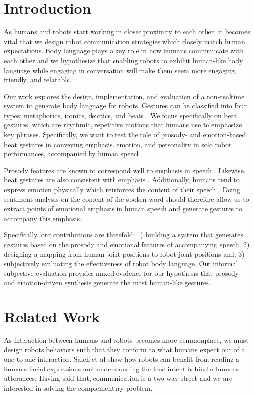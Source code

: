\section{Introduction}
As humans and robots start working in closer proximity to each other, it becomes vital that we design robot communication strategies which closely match human expectations. Body language plays a key role in how humans communicate with each other \cite{mcneill:levine} and we hypothesize that enabling robots to exhibit human-like body language while engaging in conversation will make them seem more engaging, friendly, and relatable.

Our work explores the design, implementation, and evaluation of a non-realtime system to generate body language for robots. Gestures can be classified into four types: metaphorics, iconics, deictics, and beats \cite{mcneill:levine}. We focus specifically on beat gestures, which are rhythmic, repetitive motions that humans use to emphasize key phrases. Specifically, we want to test the role of prosody- and emotion-based beat gestures in conveying emphasis, emotion, and personality in solo robot performances, accompanied by human speech.

Prosody features are known to correspond well to emphasis in speech \cite{terken:levine}. Likewise, beat gestures are also consistent with emphasis \cite{mcneill:levine}. Additionally, humans tend to express emotion physically which reinforces the content of their speech \cite{vosk}. Doing sentiment analysis on the content of the spoken word should therefore allow us to extract points of emotional emphasis in human speech and generate gestures to accompany this emphasis.

Specifically, our contributions are threefold: 1) building a system that generates gestures based on the prosody and emotional features of accompanying speech, 2) designing a mapping from human joint positions to robot joint positions and, 3) subjectively evaluating the effectiveness of robot body language. Our informal subjective evaluation provides mixed evidence for our hypothesis that prosody- and emotion-driven synthesis generate the most human-like gestures.

\section{Related Work}
As interaction between humans and robots becomes more commonplace, we must design robots behaviors such that they conform to what humans expect out of a one-to-one interaction. Saleh et al \cite{saleh:10} show how robots can benefit from reading a human\textquotesingle s facial expressions and understanding the true intent behind a human\textquotesingle s utterances. Having said that, communication is a two-way street and we are interested in solving the complementary problem.

